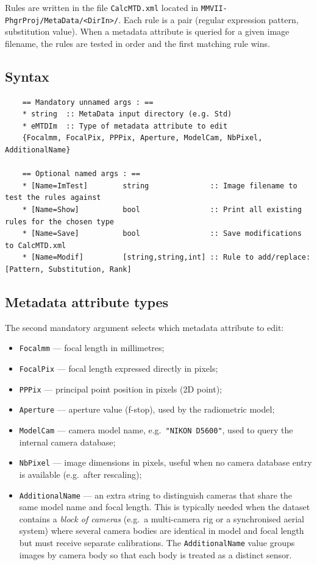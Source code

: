 Rules are written in the file {\tt CalcMTD.xml} located in
{\tt MMVII-PhgrProj/MetaData/<DirIn>/}.
Each rule is a pair (regular expression pattern, substitution value).
When a metadata attribute is queried for a given image filename, the rules are
tested in order and the first matching rule wins.

\subsection{Syntax}

\begin{verbatim}
	== Mandatory unnamed args : ==
	* string  :: MetaData input directory (e.g. Std)
	* eMTDIm  :: Type of metadata attribute to edit
	{Focalmm, FocalPix, PPPix, Aperture, ModelCam, NbPixel, AdditionalName}

	== Optional named args : ==
	* [Name=ImTest]        string              :: Image filename to test the rules against
	* [Name=Show]          bool                :: Print all existing rules for the chosen type
	* [Name=Save]          bool                :: Save modifications to CalcMTD.xml
	* [Name=Modif]         [string,string,int] :: Rule to add/replace: [Pattern, Substitution, Rank]
\end{verbatim}

\subsection{Metadata attribute types}

The second mandatory argument selects which metadata attribute to edit:

\begin{itemize}
	\item {\tt Focalmm} --- focal length in millimetres;

	\item {\tt FocalPix} --- focal length expressed directly in pixels;

	\item {\tt PPPix} --- principal point position in pixels (2D point);

	\item {\tt Aperture} --- aperture value (f-stop), used by the radiometric model;

	\item {\tt ModelCam} --- camera model name, e.g.\ {\tt "NIKON D5600"}, used to query the
	internal camera database;

	\item {\tt NbPixel} --- image dimensions in pixels, useful when no camera database entry
	is available (e.g.\ after rescaling);

	\item {\tt AdditionalName} --- an extra string to distinguish cameras that share the same
	model name and focal length. This is typically needed when the dataset contains a
	\emph{block of cameras} (e.g.\ a multi-camera rig or a synchronised aerial system)
	where several camera bodies are identical in model and focal length but must receive
	separate calibrations. The {\tt AdditionalName} value groups images by camera body
	so that each body is treated as a distinct sensor.
\end{itemize}

